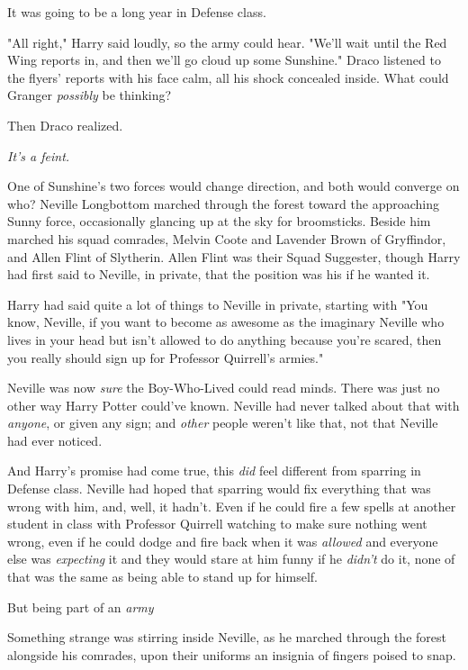 It was going to be a long year in Defense class.

"All right," Harry said loudly, so the army could hear. "We'll wait until the
Red Wing reports in, and then we'll go cloud up some Sunshine."
\sbreak
Draco listened to the flyers' reports with his face calm, all his shock
concealed inside. What could Granger \emph{possibly} be thinking?

Then Draco realized.

\emph{It's a feint.}

One of Sunshine's two forces would change direction, and both would converge
on{\el} who?
\sbreak
Neville Longbottom marched through the forest toward the approaching Sunny
force, occasionally glancing up at the sky for broomsticks. Beside him marched
his squad comrades, Melvin Coote and Lavender Brown of Gryffindor, and Allen
Flint of Slytherin. Allen Flint was their Squad Suggester, though Harry had
first said to Neville, in private, that the position was his if he wanted it.

Harry had said quite a lot of things to Neville in private, starting with "You
know, Neville, if you want to become as awesome as the imaginary Neville who
lives in your head but isn't allowed to do anything because you're scared, then
you really should sign up for Professor Quirrell's armies."

Neville was now \emph{sure} the Boy-Who-Lived could read minds. There was just
no other way Harry Potter could've known. Neville had never talked about that
with \emph{anyone}, or given any sign; and \emph{other} people weren't like
that, not that Neville had ever noticed.

And Harry's promise had come true, this \emph{did} feel different from sparring
in Defense class. Neville had hoped that sparring would fix everything that was
wrong with him, and, well, it hadn't. Even if he could fire a few spells at
another student in class with Professor Quirrell watching to make sure nothing
went wrong, even if he could dodge and fire back when it was \emph{allowed} and
everyone else was \emph{expecting} it and they would stare at him funny if he
\emph{didn't} do it, none of that was the same as being able to stand up for
himself.

But being part of an \emph{army{\el}}

Something strange was stirring inside Neville, as he marched through the forest
alongside his comrades, upon their uniforms an insignia of fingers poised to
snap.

